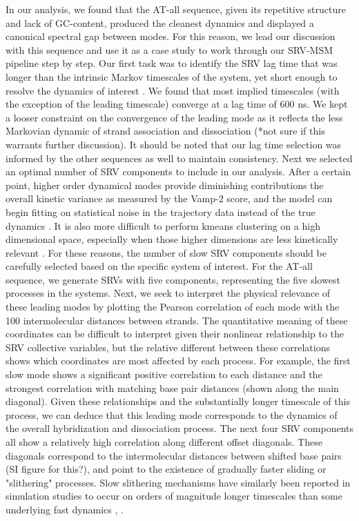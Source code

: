 \documentclass[journal=jpcbfk,manuscript=article]{achemso}
\begin{document}
In our analysis, we found that the AT-all sequence, given its repetitive structure and lack of GC-content, produced the cleanest dynamics and displayed a canonical spectral gap between modes. For this reason, we lead our discussion with this sequence and use it as a case study to work through our SRV-MSM pipeline step by step. Our first task was to identify the SRV lag time that was longer than the intrinsic Markov timescales of the system, yet short enough to resolve the dynamics of interest \citep{Phys2018MarkovValidation}. We found that most implied timescales (with the exception of the leading timescale) converge at a lag time of 600 ns. We kept a looser constraint on the convergence of the leading mode as it reflects the less Markovian dynamic of strand association and dissociation (*not sure if this warrants further discussion). It should be noted that our lag time selection was informed by the other sequences as well to maintain consistency. Next we selected an optimal number of SRV components to include in our analysis. After a certain point, higher order dynamical modes provide diminishing contributions the overall kinetic variance as measured by the Vamp-2 score, and the model can begin fitting on statistical noise in the trajectory data instead of the true dynamics \citep{McGibbon2015VariationalKinetics}. It is also more difficult to perform kmeans clustering on a high dimensional space, especially when those higher dimensions are less kinetically relevant \citep{Pande2010EverythingAsk}. For these reasons, the number of slow SRV components should be carefully selected based on the specific system of interest. For the AT-all sequence, we generate SRVs with five components, representing the five slowest processes in the systems. Next, we seek to interpret the physical relevance of these leading modes by plotting the Pearson correlation of each mode with the 100 intermolecular distances between strands. The quantitative meaning of these coordinates can be difficult to interpret given their nonlinear relationship to the SRV collective variables, but the relative different between these correlations shows which coordinates are most affected by each process. For example, the first slow mode shows a significant positive correlation to each distance and the strongest correlation with matching base pair distances (shown along the main diagonal). Given these relationships and the substantially longer timescale of this process, we can deduce that this leading mode corresponds to the dynamics of the overall hybridization and dissociation process. The next four SRV components all show a relatively high correlation along different offset diagonals. These diagonals correspond to the intermolecular distances between shifted base pairs (SI figure for this?), and point to the existence of gradually faster sliding or "slithering" processes. Slow slithering mechanisms have similarly been reported in simulation studies to occur on orders of magnitude longer timescales than some  underlying fast dynamics \citep{Markegard2015}, \citep{Xiao2019}. 
\end{document}
